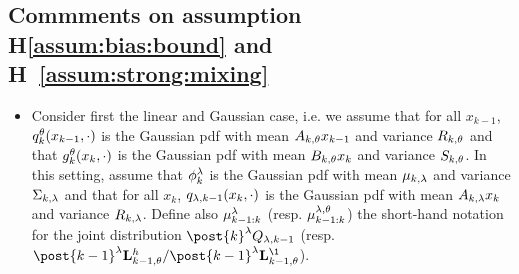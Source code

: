 \documentclass{article}
\begin{document}
\subsection{Commments on assumption H\ref{assum:bias:bound} and H~\ref{assum:strong:mixing}}
\label{sec:assumptions}
\begin{itemize}
\item
Consider first the linear and Gaussian case, i.e. we assume that for all $x_{k-1}$, $q_{k}^{\theta}(x_{k-1}, \cdot)$ is the Gaussian pdf with mean $A_{k,\theta} x_{k-1}$ and variance $R_{k,\theta}$  and that $g_{k}^{\theta}(x_{k},\cdot)$ is the Gaussian pdf with mean $B_{k,\theta} x_k$ and variance $S_{k,\theta}$. In this setting, assume that $\phi_k^\lambda$ is the Gaussian pdf with mean $\mu_{k,\lambda}$ and variance $\Sigma_{k,\lambda}$ and that for all $x_k$, $q_{\lambda,k-1}(x_{k}, \cdot)$ is the Gaussian pdf with mean $A_{k,\lambda} x_k$ and variance $R_{k,\lambda}$. Define also $\mu_{k-1:k}^\lambda$  (resp. $\mu_{k-1:k}^{\lambda,\theta}$) the short-hand notation for the joint distribution $\post{k}^{\parvar}Q_{\parvar,k-1} $ (resp. $\post{k-1}^{\parvar} \uk{k-1,\parvec}h/\post{k-1}^{\parvar} \uk{k-1,\parvec}\1$).


\end{itemize}
\end{document}
